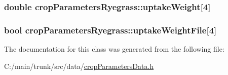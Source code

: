 \hypertarget{classcrop_parameters_ryegrass_a233c770d2775beda23abccf86b1872cd}{
\subsubsection[{uptakeWeight}]{\setlength{\rightskip}{0pt plus 5cm}double {\bf cropParametersRyegrass::uptakeWeight}\mbox{[}4\mbox{]}}}
\label{classcrop_parameters_ryegrass_a233c770d2775beda23abccf86b1872cd}
\hypertarget{classcrop_parameters_ryegrass_afccc3676a53ab5fc31fcb8bfd8e9468e}{
\subsubsection[{uptakeWeightFile}]{\setlength{\rightskip}{0pt plus 5cm}bool {\bf cropParametersRyegrass::uptakeWeightFile}\mbox{[}4\mbox{]}}}
\label{classcrop_parameters_ryegrass_afccc3676a53ab5fc31fcb8bfd8e9468e}


The documentation for this class was generated from the following file:\begin{DoxyCompactItemize}
\item 
C:/main/trunk/src/data/\hyperlink{crop_parameters_data_8h}{cropParametersData.h}\end{DoxyCompactItemize}
